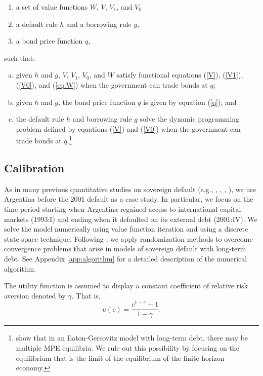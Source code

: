 \begin{enumerate}
	\item a set of value functions $W$, $V$, $V_1$, and $V_0$
	
	\item a default rule $h$ and a borrowing rule $g$,
	
	\item a bond price function $q$,
\end{enumerate}

such that:

\begin{enumerate}[(a)]
	\item given $h$ and $g$, $V$, $V_1$, $V_0$, and $W$
	satisfy functional equations  (\ref{V}),  (\ref{V1}), (\ref{V0}), and (\ref{eq:W}) when the government can trade bonds at $q$; 
	\item given $h$ and $g$, the bond price
	function $q$ is given by equation (\ref{q}); and
	\item the default rule $h$ and borrowing rule $g$ solve the
	dynamic programming problem defined by equations (\ref{V}) and
	(\ref{V0}) when the government can trade bonds at $q$.\footnote{\cite{AguiarAmador2020} show that in an Eaton-Gersovitz model with long-term debt, there may be multiple MPE equilibria. We rule out this possibility by focusing on the equilibrium that is the limit of the equilibrium of the finite-horizon economy.}
\end{enumerate}


\subsection{Calibration\label{calibration}}

As in many previous quantitative studies on sovereign default (e.g., \citealp{Arellano05}, \citealp{JIE}, \citealp{Chatty}, \citealp{PouzoPresno2016}), we use Argentina before the 2001 default as a case study. In particular, we focus on the time period starting when Argentina regained access to international capital markets (1993:I) and ending when it defaulted on its external debt (2001:IV). We solve the model numerically using value function iteration and using a discrete state space technique. Following \cite{Chatty}, we apply randomization methods to overcome convergence problems that arise in models of sovereign default with long-term debt. See Appendix \ref{app:algorithm} for a detailed description of the numerical algorithm.

The utility function is assumed to display a constant coefficient of relative risk aversion denoted by $\gamma$. That is, \begin{equation*} 
u\left( c\right) = \frac{c^{ 1-\gamma }-1}{1-\gamma }.
\end{equation*}

